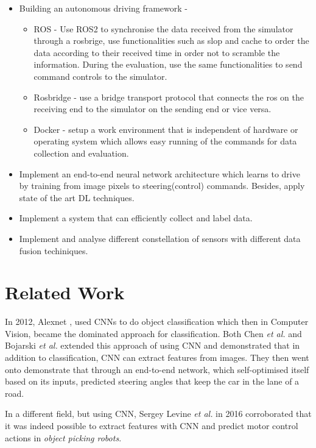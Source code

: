 \begin{itemize}
    \item Building an autonomous driving framework -
        \begin{itemize}
        \item ROS - Use ROS2 to synchronise the data received from the simulator through a
            rosbrige, use functionalities such as slop and cache to order the data according to
            their received time in order not to scramble the information. During the evaluation,
            use the same functionalities to send command controls to the simulator.
        \item Rosbridge - use a bridge transport protocol that connects the ros on the receiving end
            to the simulator on the sending end or vice versa.
        \item Docker - setup a work environment that is independent of hardware or
            operating system which allows easy running of the commands for data collection
            and evaluation.
        \end{itemize}    
    \item Implement an end-to-end neural network architecture which learns to drive by
        training from image pixels to steering(control) commands. Besides, apply state of
        the art DL techniques.
    \item Implement a system that can efficiently collect and label data.
    \item Implement and analyse different constellation of sensors with different data
        fusion techiniques. 
\end{itemize}

\section{Related Work}
In 2012, Alexnet \cite{Alexnet2012}, used CNNs to do object classification which then
in Computer Vision, became the dominated approach for classification. Both Chen \textit{et
al.} \cite{chen2017} and Bojarski \textit{et al.} \cite{bojarski2016end} extended this
approach of using CNN and demonstrated that in addition to classification, CNN can
extract features from images. They then went onto demonstrate that through an end-to-end
network, which self-optimised itself based on its inputs, predicted steering angles that keep the car in the
lane of a road. 

In a different field, but using CNN, Sergey Levine \textit{et al.} 
\cite{GooglePaperonCNNActuation} in 2016 corroborated that it was indeed possible to extract
features with CNN and predict motor control actions in \textit{object picking robots}.

